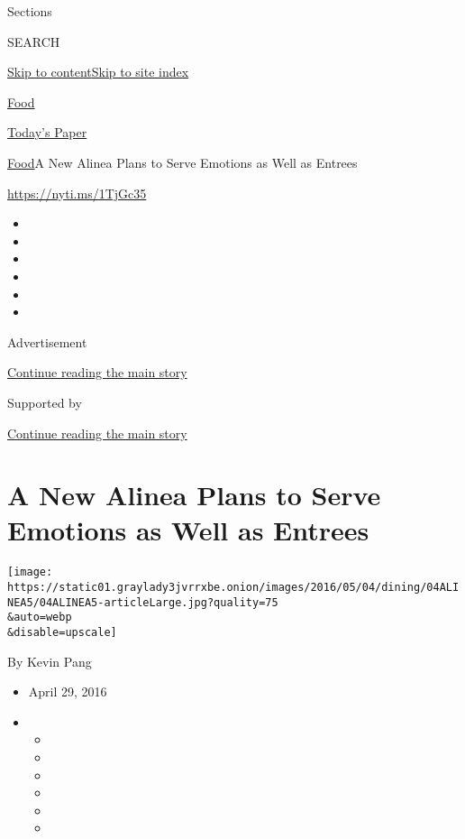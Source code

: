 Sections

SEARCH

\protect\hyperlink{site-content}{Skip to
content}\protect\hyperlink{site-index}{Skip to site index}

\href{https://www.nytimes3xbfgragh.onion/section/food}{Food}

\href{https://myaccount.nytimes3xbfgragh.onion/auth/login?response_type=cookie\&client_id=vi}{}

\href{https://www.nytimes3xbfgragh.onion/section/todayspaper}{Today's
Paper}

\href{/section/food}{Food}\textbar{}A New Alinea Plans to Serve Emotions
as Well as Entrees

\url{https://nyti.ms/1TjGc35}

\begin{itemize}
\item
\item
\item
\item
\item
\item
\end{itemize}

Advertisement

\protect\hyperlink{after-top}{Continue reading the main story}

Supported by

\protect\hyperlink{after-sponsor}{Continue reading the main story}

\hypertarget{a-new-alinea-plans-to-serve-emotions-as-well-as-entrees}{%
\section{A New Alinea Plans to Serve Emotions as Well as
Entrees}\label{a-new-alinea-plans-to-serve-emotions-as-well-as-entrees}}

\texttt{[image: https://static01.graylady3jvrrxbe.onion/images/2016/05/04/dining/04ALINEA5/04ALINEA5-articleLarge.jpg?quality=75\\\&auto=webp\\\&disable=upscale]}

By Kevin Pang

\begin{itemize}
\item
  April 29, 2016
\item
  \begin{itemize}
  \item
  \item
  \item
  \item
  \item
  \item
  \end{itemize}
\end{itemize}

